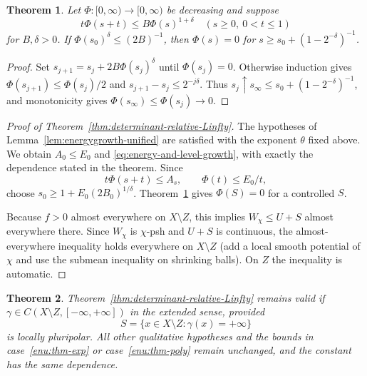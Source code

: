 \documentclass[oneside,english,letterpaper]{amsart}
\numberwithin{equation}{section}
\theoremstyle{plain}
\newtheorem{thm}{Theorem}[section]
\theoremstyle{definition}
\theoremstyle{remark}
\begin{document}
\begin{thm} \cite[Lemma~2]{MR4593734}
	\label{thm:Degiorgi}
	Let $\Phi:[0,\infty)\to[0,\infty)$ be decreasing and suppose
	\[
	t\Phi(s+t)\leq B\Phi(s)^{1+\delta}
	\quad(s\geq0,\ 0<t\leq1)
	\]
	for $B,\delta>0$. If $\Phi(s_0)^\delta\leq(2B)^{-1}$, then
	$\Phi(s)=0$ for $s\geq s_0+(1-2^{-\delta})^{-1}$.

\end{thm}
\begin{proof}
	Set $s_{j+1}=s_j+2B\Phi(s_j)^\delta$ until $\Phi(s_j)=0$.
	Otherwise induction gives $\Phi(s_{j+1})\leq\Phi(s_j)/2$ and
	$s_{j+1}-s_j\leq2^{-j\delta}$. Thus
	$s_j\uparrow s_\infty\leq s_0+(1-2^{-\delta})^{-1}$, and
	monotonicity gives $\Phi(s_\infty)\leq\Phi(s_j)\to0$.
\end{proof}

\begin{proof}[Proof of Theorem~\ref{thm:determinant-relative-Linfty}]
	The hypotheses of Lemma~\ref{lem:energygrowth-unified} are
	satisfied with the exponent $\theta$ fixed above.
	We obtain $A_0\leq E_0$ and \eqref{eq:energy-and-level-growth}, with
	exactly the dependence stated in the theorem. Since
	\[
	t\Phi(s+t)\leq A_s,\qquad \Phi(t)\leq E_0/t,
	\]
	choose $s_0\geq1+E_0(2B_0)^{1/\delta}$. Theorem~\ref{thm:Degiorgi}
	gives $\Phi(S)=0$ for a controlled $S$.
	
	Because $f>0$ almost everywhere on $X\setminus Z$, this implies
	$W_\chi\leq U+S$ almost everywhere there. Since $W_\chi$ is
	$\chi$-psh and $U+S$ is continuous, the almost-everywhere
	inequality holds everywhere on $X\setminus Z$ (add a local
	smooth potential of $\chi$ and use the submean inequality on
	shrinking balls). On $Z$ the inequality is automatic.
\end{proof}

\begin{thm}
	\label{thm:infinite-density-relative-Linfty}
	Theorem~\ref{thm:determinant-relative-Linfty} remains valid if
	$\gamma\in C(X\setminus Z,[-\infty,+\infty])$ in the extended sense,
	provided
	\[
	S=\{x\in X\setminus Z:\gamma(x)=+\infty\}
	\]
	is locally pluripolar. All other qualitative hypotheses and the
	bounds in case~\ref{enu:thm-exp} or case~\ref{enu:thm-poly} remain
	unchanged, and the constant has the same dependence.
\end{thm}
\end{document}
